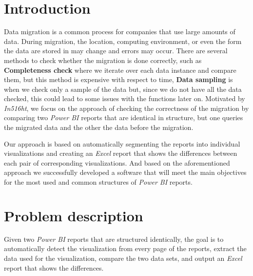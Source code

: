 \documentclass[fleqn,moreauthors,10pt]{ds_report}
\affiliation{\textit{Advisor: prof. dr. Erik \v{S}trumbelj}} %
\begin{document}
\flushbottom 

\maketitle 

\thispagestyle{empty} 


\section*{Introduction}


 Data migration is a common process for companies that use large amounts of data. During migration, the location, computing environment, or even the form the data are stored in may change and errors may occur.  There are several methods to check whether the migration is done correctly, such as \textbf{Completeness check} where we iterate over each data instance and compare them, but this method is expensive with respect to time, \textbf{Data sampling} is when we check only a sample of the data but, since we do not have all the data checked, this could lead to some issues with the functions later on. Motivated by \textit{In516ht}, we focus on the approach of checking the correctness of the migration by comparing two  \textit{Power BI} reports that are identical in structure, but one queries the migrated data and the other the data before the migration.
 \par
Our approach is based on automatically segmenting the reports into individual visualizations and creating an \textit{Excel} report that shows the differences between each pair of corresponding visualizations. And based on the aforementioned approach we successfully developed a software that will meet the main objectives for the most used and common structures of \textit{Power BI} reports.

\section*{Problem description}
Given two \textit{Power BI} reports that are structured identically, the goal is to automatically detect the visualization from every page of the reports, extract the data used for the visualization, compare the two data sets, and output an \textit{Excel} report that shows the differences. 
\end{document}
